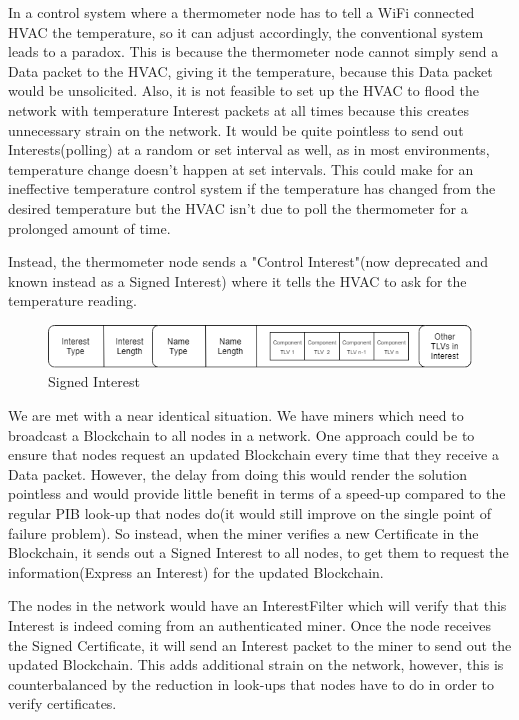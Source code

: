 In a control system where a thermometer node has to tell a WiFi connected HVAC the temperature, so it can adjust accordingly, the conventional system leads to a paradox. This is because the thermometer node cannot simply send a Data packet to the HVAC, giving it the temperature, because this Data packet would be unsolicited. Also, it is not feasible to set up the HVAC to flood the network with temperature Interest packets at all times because this creates unnecessary strain on the network. It would be quite pointless to send out Interests(polling) at a random or set interval as well, as in most environments, temperature change doesn't happen at set intervals. This could make for an ineffective temperature control system if the temperature has changed from the desired temperature but the HVAC isn't due to poll the thermometer for a prolonged amount of time. \par 
Instead, the thermometer node sends a "Control Interest"(now deprecated and known instead as a Signed Interest) where it tells the HVAC to ask for the temperature reading.\par 
\begin{figure}
\includegraphics[width=6in]{signedinterest.png}
\caption{Signed Interest}
\end{figure}
We are met with a near identical situation. We have miners which need to broadcast a Blockchain to all nodes in a network. One approach could be to ensure that nodes request an updated Blockchain every time that they receive a Data packet. However, the delay from doing this would render the solution pointless and would provide little benefit in terms of a speed-up compared to the regular PIB look-up that nodes do(it would still improve on the single point of failure problem). So instead, when the miner verifies a new Certificate in the Blockchain, it sends out a Signed Interest to all nodes, to get them to request the information(Express an Interest) for the updated Blockchain. \par

The nodes in the network would have an InterestFilter which will verify that this Interest is indeed coming from an authenticated miner. Once the node receives the Signed Certificate, it will send an Interest packet to the miner to send out the updated Blockchain. This adds additional strain on the network, however, this is counterbalanced by the reduction in look-ups that nodes have to do in order to verify certificates.
